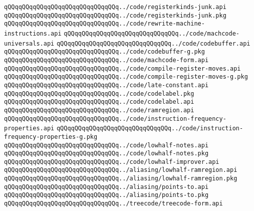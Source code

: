\verb|qQQqqQQqqQQqqQQqqQQqqQQqqQQqqQQq../code/registerkinds-junk.api|\newline
\verb|qQQqqQQqqQQqqQQqqQQqqQQqqQQqqQQq../code/registerkinds-junk.pkg|\newline
\verb|qQQqqQQqqQQqqQQqqQQqqQQqqQQqqQQq../code/rewrite-machine-instructions.api|\newline
\verb|qQQqqQQqqQQqqQQqqQQqqQQqqQQqqQQq../code/machcode-universals.api|\newline
\verb|qQQqqQQqqQQqqQQqqQQqqQQqqQQqqQQq../code/codebuffer.api|\newline
\verb|qQQqqQQqqQQqqQQqqQQqqQQqqQQqqQQq../code/codebuffer-g.pkg|\newline
\verb|qQQqqQQqqQQqqQQqqQQqqQQqqQQqqQQq../code/machcode-form.api|\newline
\verb|qQQqqQQqqQQqqQQqqQQqqQQqqQQqqQQq../code/compile-register-moves.api|\newline
\verb|qQQqqQQqqQQqqQQqqQQqqQQqqQQqqQQq../code/compile-register-moves-g.pkg|\newline
\verb|qQQqqQQqqQQqqQQqqQQqqQQqqQQqqQQq../code/late-constant.api|\newline
\verb|qQQqqQQqqQQqqQQqqQQqqQQqqQQqqQQq../code/codelabel.pkg|\newline
\verb|qQQqqQQqqQQqqQQqqQQqqQQqqQQqqQQq../code/codelabel.api|\newline
\verb|qQQqqQQqqQQqqQQqqQQqqQQqqQQqqQQq../code/ramregion.api|\newline
\verb|qQQqqQQqqQQqqQQqqQQqqQQqqQQqqQQq../code/instruction-frequency-properties.api|\newline
\verb|qQQqqQQqqQQqqQQqqQQqqQQqqQQqqQQq../code/instruction-frequency-properties-g.pkg|\newline
\verb|qQQqqQQqqQQqqQQqqQQqqQQqqQQqqQQq../code/lowhalf-notes.api|\newline
\verb|qQQqqQQqqQQqqQQqqQQqqQQqqQQqqQQq../code/lowhalf-notes.pkg|\newline
\verb|qQQqqQQqqQQqqQQqqQQqqQQqqQQqqQQq../code/lowhalf-improver.api|\newline
\verb|qQQqqQQqqQQqqQQqqQQqqQQqqQQqqQQq../aliasing/lowhalf-ramregion.api|\newline
\verb|qQQqqQQqqQQqqQQqqQQqqQQqqQQqqQQq../aliasing/lowhalf-ramregion.pkg|\newline
\verb|qQQqqQQqqQQqqQQqqQQqqQQqqQQqqQQq../aliasing/points-to.api|\newline
\verb|qQQqqQQqqQQqqQQqqQQqqQQqqQQqqQQq../aliasing/points-to.pkg|\newline
\verb|qQQqqQQqqQQqqQQqqQQqqQQqqQQqqQQq../treecode/treecode-form.api|\newline
